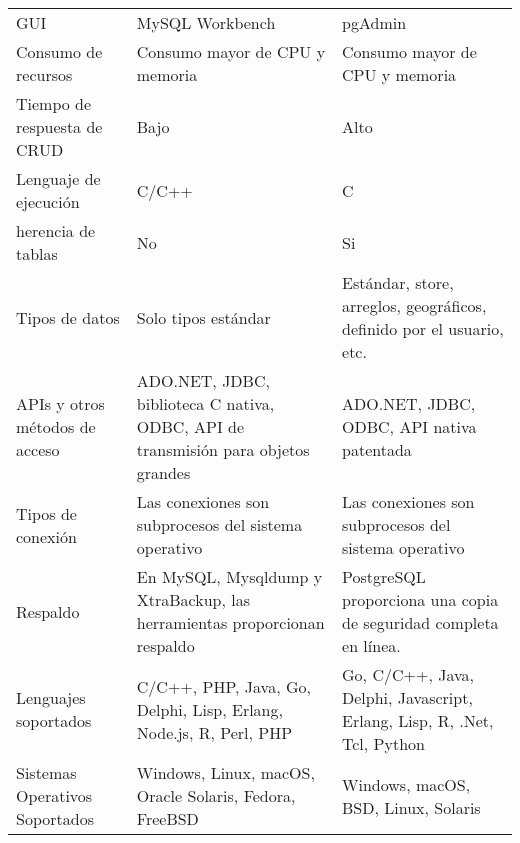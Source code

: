 \begin{longtable}{|p{5cm}|p{5cm}|p{5cm}|}
    \hline \hline
    \endlastfoot
    GUI                                            & MySQL Workbench                                                                   & pgAdmin                                                                 \\
    Consumo de recursos                            & Consumo mayor de CPU y memoria                                                    & Consumo mayor de CPU y memoria                                          \\
    Tiempo de respuesta de CRUD                    & Bajo                                                                              & Alto                                                                    \\
    Lenguaje de ejecución                          & C/C++                                                                             & C                                                                       \\
    herencia de tablas                             & No                                                                                & Si                                                                      \\
    Tipos de datos                                 & Solo tipos estándar                                                               & Estándar, store, arreglos, geográficos, definido por el usuario, etc.   \\
    APIs y otros métodos de acceso                 & ADO.NET, JDBC, biblioteca C nativa, ODBC, API de transmisión para objetos grandes & ADO.NET, JDBC, ODBC, API nativa patentada                               \\
    Tipos de conexión                              & Las conexiones son subprocesos del sistema operativo                              & Las conexiones son subprocesos del sistema operativo                    \\
    Respaldo                                       & En MySQL, Mysqldump y XtraBackup, las herramientas proporcionan respaldo          & PostgreSQL proporciona una copia de seguridad completa en línea.        \\
    Lenguajes soportados                           & C/C++, PHP, Java, Go, Delphi, Lisp, Erlang, Node.js, R, Perl, PHP                 & Go, C/C++, Java, Delphi, Javascript, Erlang, Lisp, R, .Net, Tcl, Python \\
    Sistemas Operativos Soportados                 & Windows, Linux, macOS, Oracle Solaris, Fedora, FreeBSD                            & Windows, macOS, BSD, Linux, Solaris                                     \\
\end{longtable}